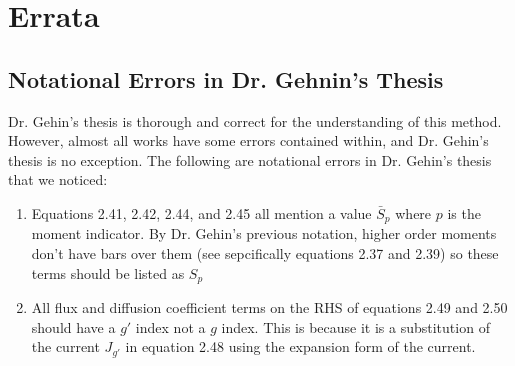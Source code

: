 \section{Errata}

\subsection{Notational Errors in Dr. Gehnin's Thesis}

Dr. Gehin's thesis is thorough and correct for the understanding of this method.
However, almost all works have some errors contained within, and Dr. Gehin's thesis is no exception.
The following are notational errors in Dr. Gehin's thesis that we noticed:
\begin{enumerate}
    \item Equations 2.41, 2.42, 2.44, and 2.45 all mention a value $\bar{S}_p$ where $p$ is the moment indicator.
    By Dr. Gehin's previous notation, higher order moments don't have bars over them (see sepcifically equations 2.37 and 2.39) so these terms should be listed as $S_p$
    \item All flux and diffusion coefficient terms on the RHS of equations 2.49 and 2.50 should have a $g'$ index not a $g$ index.
    This is because it is a substitution of the current $J_{g'}$ in equation 2.48 using the expansion form of the current.
\end{enumerate}













